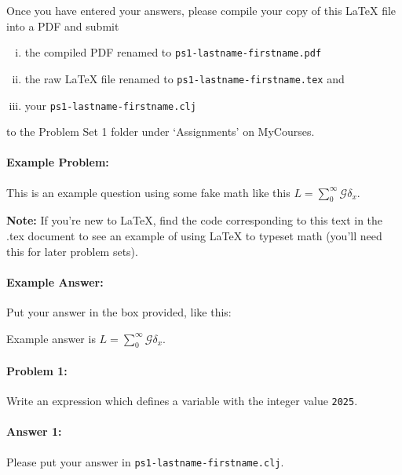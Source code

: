 \documentclass[10pt]{article}
\newenvironment{AnswerBox}{\begin{mdframed}[style=simple]}{\end{mdframed}}
\newcommand{\required}[1]{{\color{blue}{#1}}}
\newcommand{\PSnum}{1}
\begin{document}
Once you have entered your answers, please compile your copy of this \LaTeX{}
file into a PDF and submit
\begin{enumerate}[(i),noitemsep]
  \item the compiled PDF renamed to \texttt{ps\PSnum-lastname-firstname.pdf}
  \item the raw \LaTeX{} file renamed to
    \texttt{ps\PSnum-lastname-firstname.tex} and
  \item your \texttt{ps\PSnum-lastname-firstname.clj}
\end{enumerate}
to the Problem Set \PSnum{} folder under `Assignments' on MyCourses.




\noindent\hrulefill%

\paragraph{Example Problem:} This is an example question using some fake math
like this $L=\sum_0^{\infty} \mathcal{G} \delta_x$.

\textbf{Note:} If you're new to \LaTeX{}, find the code corresponding to this
text in the .tex document to see an example of using \LaTeX{} to typeset math
(you'll need this for later problem sets).


\paragraph{Example Answer:} Put your answer in the box provided, like this:
\begin{AnswerBox}
  Example answer is $L=\sum_0^{\infty} \mathcal{G} \delta_x$.
\end{AnswerBox}


\clearpage\pagebreak

\noindent\hrulefill%


\paragraph{Problem 1:}
Write an expression which defines a variable \required{\texttt{year}} with the
integer value \texttt{2025}.

\paragraph{Answer 1:} Please put your answer in
\texttt{ps\PSnum-lastname-firstname.clj}.
\end{document}
